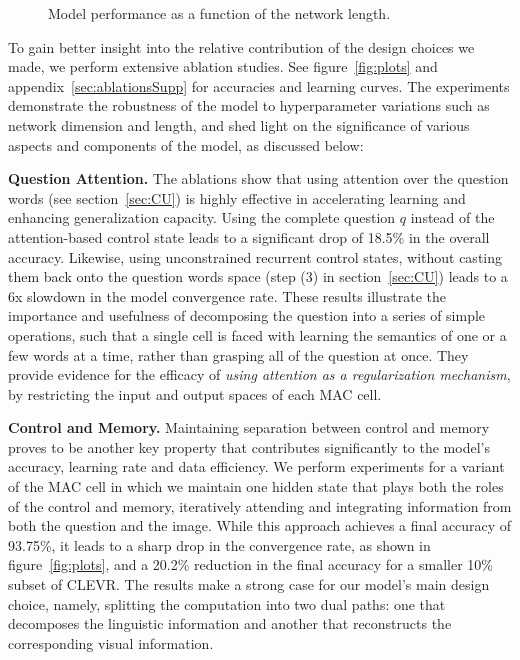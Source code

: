 \documentclass[fleqn]{article}
\newcommand{\figref}[1]{figure~\ref{fig:#1}}
\newcommand{\secref}[1]{section~\ref{sec:#1}}
\newcommand{\appref}[1]{appendix~\ref{sec:#1}}
\begin{document}
\begin{wrapfigure}[11]{r}{0.24\textwidth}
\centering
\vspace{-8mm}

\centering
{}

\vspace{-2mm}
\caption{Model performance as a function of the network length. }
\end{wrapfigure}

To gain better insight into the relative contribution of the design choices we made, we perform extensive ablation studies. See \figref{plots} and \appref{ablationsSupp} for accuracies and learning curves. The experiments demonstrate the robustness of the model to hyperparameter variations such as network dimension and length, and shed light on the significance of various aspects and components of the model, as discussed below:

\textbf{Question Attention.} The ablations show that using attention over the question words (see \secref{CU}) is highly effective in accelerating learning and enhancing generalization capacity. Using the complete question \(q\) instead of the attention-based control state leads to a significant drop of 18.5\% in the overall accuracy. Likewise, using unconstrained recurrent control states, without casting them back onto the question words space (step (3) in \secref{CU}) leads to a 6x slowdown in the model convergence rate. These results illustrate the importance and usefulness of decomposing the question into a series of simple operations, such that a single cell is faced with learning the semantics of one or a few words at a time, rather than grasping all of the question at once. They provide evidence for the efficacy of \textit{using attention as a regularization mechanism}, by restricting the input and output spaces of each MAC cell.

\textbf{Control and Memory.} Maintaining separation between control and memory proves to be another key property that contributes significantly to the model's accuracy, learning rate and data efficiency. We perform experiments for a variant of the MAC cell in which we maintain one hidden state that plays both the roles of the control and memory, iteratively attending and integrating information from both the question and the image. While this approach achieves a final accuracy of 93.75\%, it leads to a sharp drop in the convergence rate, as shown in \figref{plots}, and a 20.2\% reduction in the final accuracy for a smaller 10\% subset of CLEVR. The results make a strong case for our model's main design choice, namely, splitting the computation into two dual paths: one that decomposes the linguistic information and another that reconstructs the corresponding visual information.
\end{document}
